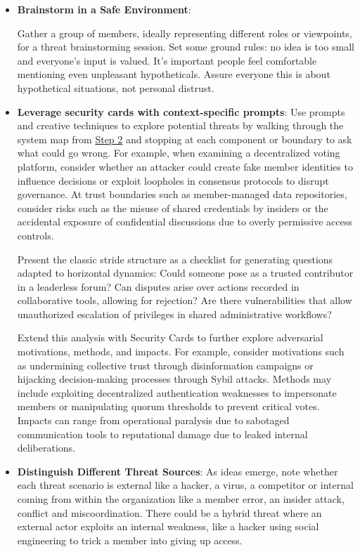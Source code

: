 \begin{itemize}

    \item \textbf{Brainstorm in a Safe Environment}:
    
    Gather a group of members, ideally representing different roles or viewpoints,
    for a threat brainstorming session. Set some ground rules: no idea is
    too small and everyone's input is valued. It's important
    people feel comfortable mentioning even unpleasant hypotheticals.
    Assure everyone this is about hypothetical situations,
    not personal distrust.

    \item \textbf{Leverage security cards with context-specific prompts}: Use
    prompts and creative techniques to explore potential threats by walking through
    the system map from \hyperref[subsec:Step2]{Step 2} and stopping at each
    component or boundary to ask what could go wrong. For example, when examining a
    decentralized voting platform, consider whether an attacker could create fake
    member identities to influence decisions or exploit loopholes in consensus
    protocols to disrupt governance. At trust boundaries such as member-managed data
    repositories, consider risks such as the misuse of shared credentials by
    insiders or the accidental exposure of confidential discussions due to overly
    permissive access controls.

    Present the classic \gls{stride} structure as a checklist for generating
    questions adapted to horizontal dynamics: Could someone pose as a trusted
    contributor in a leaderless forum? Can disputes arise over actions recorded in
    collaborative tools, allowing for rejection? Are there vulnerabilities that
    allow unauthorized escalation of privileges in shared administrative workflows?

    Extend this analysis with Security Cards to further explore adversarial
    motivations, methods, and impacts. For example, consider motivations such as
    undermining collective trust through disinformation campaigns or hijacking
    decision-making processes through Sybil attacks. Methods may include exploiting
    decentralized authentication weaknesses to impersonate members or manipulating
    quorum thresholds to prevent critical votes. Impacts can range from operational
    paralysis due to sabotaged communication tools to reputational damage due to
    leaked internal deliberations.

    \item \textbf{Distinguish Different Threat Sources}:
    As ideas emerge, note whether each threat scenario is external like a
    hacker, a virus, a competitor or internal coming from within the organization
    like a member error, an insider attack, conflict and miscoordination. There could
    be a hybrid threat where an external actor exploits an internal weakness, like
    a hacker using social engineering to trick a member into giving up access.


\end{itemize}
